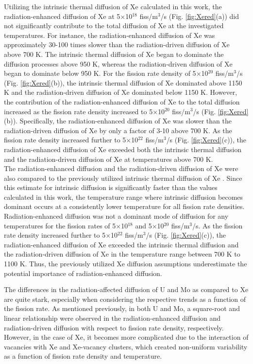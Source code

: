 \documentclass[preprint,12pt]{elsarticle}
\begin{document}
Utilizing the intrinsic thermal diffusion of Xe calculated in this work, the radiation-enhanced diffusion of Xe at 5$\times$10$^{18}$ fiss/m$^{3}$/s (Fig. \ref{fig:Xered}(a)) did not significantly contribute to the total diffusion of Xe at the investigated temperatures. For instance, the radiation-enhanced diffusion of Xe was approximately 30-100 times slower than the radiation-driven diffusion of Xe above 700 K.  The intrinsic thermal diffusion of Xe began to dominate the diffusion processes above 950 K, whereas the radiation-driven diffusion of Xe began to dominate below 950 K. For the fission rate density of 5$\times$10$^{20}$ fiss/m$^{3}$/s (Fig. \ref{fig:Xered}(b)), the intrinsic thermal diffusion of Xe dominated above 1150 K and the radiation-driven diffusion of Xe dominated below 1150 K. However, the contribution of the radiation-enhanced diffusion of Xe to the total diffusion increased as the fission rate density increased to 5$\times$10$^{20}$ fiss/m$^{3}$/s (Fig. \ref{fig:Xered}(b)). Specifically, the radiation-enhanced diffusion of Xe was slower than the radiation-driven diffusion of Xe by only a factor of 3-10 above 700 K. As the fission rate density increased further to 5$\times$10$^{22}$ fiss/m$^{3}$/s (Fig. \ref{fig:Xered}(c)), the radiation-enhanced diffusion of Xe exceeded both the intrinsic thermal diffusion and the radiation-driven diffusion of Xe at temperatures above 700 K. \\
\indent The radiation-enhanced diffusion and the radiation-driven diffusion of Xe were also compared to the previously utilized intrinsic thermal diffusion of Xe \cite{hu2016microstructural, Beeler2018microstructural}. Since this estimate for intrinsic diffusion is significantly faster than the values calculated in this work, the temperature range where intrinsic diffusion becomes dominant occurs at a consistently lower temperature for all fission rate densities. Radiation-enhanced diffusion was not a dominant mode of diffusion for any temperatures for the fission rates of 5$\times$10$^{18}$ and 5$\times$10$^{20}$ fiss/m$^{3}$/s. As the fission rate density increased further to 5$\times$10$^{22}$ fiss/m$^{3}$/s (Fig. \ref{fig:Xered}(c)), the radiation-enhanced diffusion of Xe exceeded the intrinsic thermal diffusion and the radiation-driven diffusion of Xe in the temperature range between 700 K to 1100 K. Thus, the previously utilized Xe diffusion assumptions underestimate the potential importance of radiation-enhanced diffusion. 

\indent The differences in the radiation-affected diffusion of U and Mo as compared to Xe are quite stark, especially when considering the respective trends as a function of the fission rate. As mentioned previously, in both U and Mo, a square-root and linear relationship were observed in the radiation-enhanced diffusion and radiation-driven diffusion with respect to fission rate density, respectively. However, in the case of Xe, it becomes more complicated due to the interaction of vacancies with Xe and Xe-vacancy clusters, which created non-uniform variability as a function of fission rate density and temperature. 
\\
\end{document}
